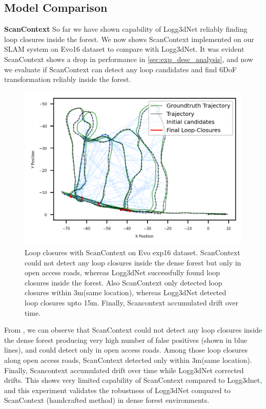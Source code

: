 \subsection*{Model Comparison}
\textbf{ScanContext}\hspace{0.5em} So far we have shown capability of Logg3dNet reliably finding loop closures inside the forest. We now shows ScanContext implemented on our SLAM system on Evo16 dataset to compare with Logg3dNet. It was evident ScanContext shows a drop in performance in \ref{sec:exp_desc_analysis}, and now we evaluate if ScanContext can detect any loop candidates and find 6DoF transformation reliably inside the forest.  
\begin{figure}[htbp]
  \centering
  \includegraphics[width=0.75\columnwidth]{pics/exp_2_sc_loop_closure.png}
  \caption{Loop closures with ScanContext on Evo exp16 dataset. ScanContext could not detect any loop closures inside the dense forest but only in open access roads, whereas Logg3dNet successfully found loop closures inside the forest. Also ScanContext only detected loop closures within 3m(same location), whereas Logg3dNet detected loop closures upto 15m. Finally, Scancontext accumulated drift over time.}
  \label{fig:exp_2_3_loop_closure_comparison}
\end{figure}

From , we can observe that ScanContext could not detect any loop closures inside the dense forest producing very high number of false positives (shown in blue lines), and could detect only in open access roads. Among those loop closures along open access roads, ScanContext detected only within 3m(same location). Finally, Scancontext accumulated drift over time while Logg3dNet corrected drifts. This shows very limited capability of ScanContext compared to Logg3dnet, and this experiment validates the robustness of Logg3dNet compared to ScanContext (handcrafted method) in dense forest environments.



